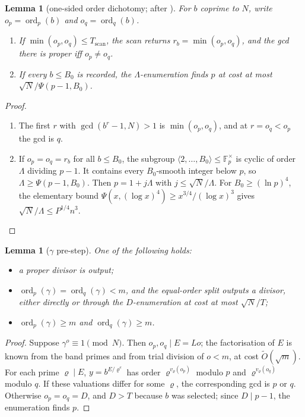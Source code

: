 \documentclass[11pt]{amsart}
\newtheorem{lemma}[theorem]{Lemma}
\theoremstyle{definition}
\newcommand{\ord}{\operatorname{ord}}
\begin{document}
\begin{lemma}[one-sided order dichotomy; after {\cite{hh2026}}]\label{lem:O}
For $b$ coprime to $N$, write $o_p=\ord_p(b)$ and $o_q=\ord_q(b)$.
\begin{enumerate}[label=(\alph*)]
\item If $\min(o_p,o_q)\le T_{\mathrm{scan}}$, the scan returns $r_b=\min(o_p,o_q)$, and the gcd
  there is proper iff $o_p\ne o_q$.
\item If every $b\le B_0$ is recorded, the $\Lambda$-enumeration finds $p$ at cost at most
  $\sqrt N/\Psi(p-1,B_0)$.
\end{enumerate}
\end{lemma}
\begin{proof}
\begin{enumerate}[label=(\alph*)]
\item The first $r$ with $\gcd(b^r-1,N)>1$ is $\min(o_p,o_q)$, and at $r=o_q<o_p$ the gcd is $q$.
\item If $o_p=o_q=r_b$ for all $b\le B_0$, the subgroup $\langle2,\dots,B_0\rangle\le\mathbb
  F_p^\times$ is cyclic of order $\Lambda$ dividing $p-1$. It contains every $B_0$-smooth integer
  below $p$, so $\Lambda\ge\Psi(p-1,B_0)$. Then $p=1+j\Lambda$ with $j\le\sqrt N/\Lambda$.
  For $B_0\ge(\ln p)^4$, the elementary bound $\Psi(x,(\log x)^4)\ge x^{3/4}/(\log x)^3$ gives
  $\sqrt N/\Lambda\le P^{1/4}n^3$.
\end{enumerate}
\end{proof}

\begin{lemma}[$\gamma$ pre-step]\label{lem:G}
One of the following holds:
\begin{itemize}
\item a proper divisor is output;
\item $\ord_p(\gamma)=\ord_q(\gamma)<m$, and the equal-order split outputs a divisor, either
  directly or through the $D$-enumeration at cost at most $\sqrt N/T$;
\item $\ord_p(\gamma)\ge m$ and $\ord_q(\gamma)\ge m$.
\end{itemize}
\end{lemma}
\begin{proof}
Suppose $\gamma^o\equiv1\pmod N$. Then $o_p,o_q\mid E=Lo$; the factorisation of $E$ is known
from the band primes and from trial division of $o<m$, at cost $\tilde O(\sqrt m)$. For each prime $\varrho\mid E$,
$y=b^{E/\varrho^e}$ has order $\varrho^{v_\varrho(o_p)}$ modulo $p$ and $\varrho^{v_\varrho(o_q)}$
modulo $q$. If these valuations differ for some $\varrho$, the corresponding gcd is $p$ or $q$.
Otherwise $o_p=o_q=D$, and $D>T$ because $b$ was selected; since $D\mid p-1$, the enumeration
finds $p$.
\end{proof}
\end{document}
